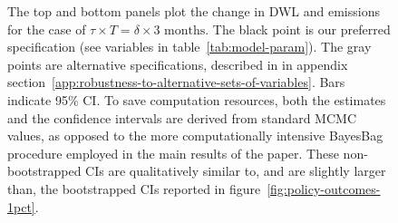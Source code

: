 \documentclass[12pt,oneside,letterpaper]{article}
\theoremstyle{definition}
\begin{document}
\begin{refsection}
\begin{figure}[!bthp]
The top and bottom panels plot the change in \gls{DWL} and emissions for the case of \(\tau \times T = \delta \times \text{3 months}\).
The black point is our preferred specification
(see variables in table~\ref{tab:model-param}).
The gray points are alternative specifications, described in in appendix section~\ref{app:robustness-to-alternative-sets-of-variables}.
Bars indicate 95\% \gls{CI}.
To save computation resources, both the estimates and the confidence intervals are derived from standard \gls{MCMC} values, as opposed to the more computationally intensive BayesBag procedure employed in the main results of the paper.
These non-bootstrapped CIs are qualitatively similar to, and are slightly larger than, the bootstrapped CIs reported in figure~\ref{fig:policy-outcomes-1pct}.
\end{figure}


\end{refsection}

\newpage

\begin{refsection}
\begin{RaggedRight}
\singlespacing
\twocolumn
\nocite{*}
\printbibliography[heading=subbibliography, title={Software Citations}]
\end{RaggedRight}
\end{refsection}
\end{document}
